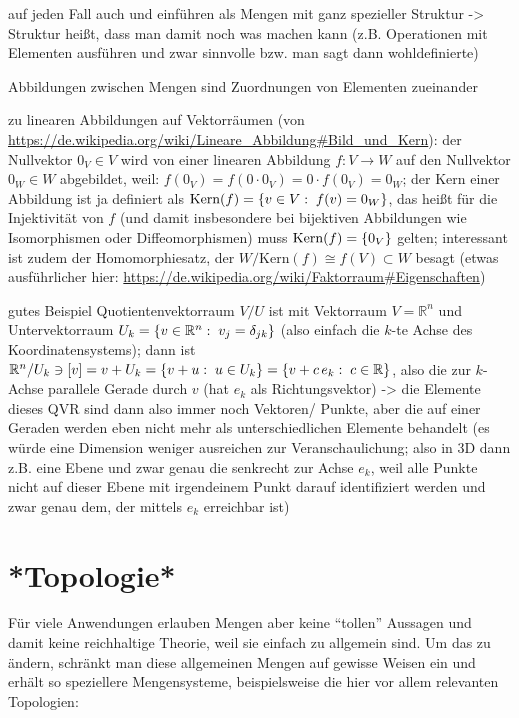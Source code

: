 \documentclass[../H_Analysis_main.tex]{subfiles}
\begin{document}
auf jeden Fall auch  und  einführen als Mengen mit ganz spezieller Struktur -> Struktur heißt, dass man damit noch was machen kann (z.B. Operationen mit Elementen ausführen und zwar sinnvolle bzw. man sagt dann wohldefinierte)


Abbildungen zwischen Mengen sind Zuordnungen von Elementen zueinander

zu linearen Abbildungen auf Vektorräumen (von \url{https://de.wikipedia.org/wiki/Lineare_Abbildung#Bild_und_Kern}): der Nullvektor $0_V \in V$ wird von einer linearen Abbildung $f: V \rightarrow W$ auf den Nullvektor $0_W \in W$ abgebildet, weil: $f(0_V) = f(0 \cdot 0_V) = 0 \cdot f(0_V) = 0_W$; der Kern einer Abbildung ist ja definiert als $\text{Kern}(f) = \qty{v \in V: \; f(v) = 0_W}$, das heißt für die Injektivität von $f$ (und damit insbesondere bei bijektiven Abbildungen wie Isomorphismen oder Diffeomorphismen) muss $\text{Kern}(f) = \qty{0_V}$ gelten; interessant ist zudem der Homomorphiesatz, der $W/ \text{Kern}(f) \cong f(V) \subset W$ besagt (etwas ausführlicher hier: \url{https://de.wikipedia.org/wiki/Faktorraum#Eigenschaften})

gutes Beispiel Quotientenvektorraum $V/ U$ ist mit Vektorraum $V = \mathbb{R}^n$ und Untervektorraum $U_k = \qty{v \in \mathbb{R}^n: \; v_j = \delta_{j k}}$ (also einfach die $k$-te Achse des Koordinatensystems); dann ist $\mathbb{R}^n/ U_k \ni [v] = v + U_k = \qty{v + u: \; u \in U_k} = \qty{v + c \, e_k: \; c \in \mathbb{R}}$, also die zur $k$-Achse parallele Gerade durch $v$ (hat $e_k$ als Richtungsvektor) -> die Elemente dieses QVR sind dann also immer noch Vektoren/ Punkte, aber die auf einer Geraden werden eben nicht mehr als unterschiedlichen Elemente behandelt (es würde eine Dimension weniger ausreichen zur Veranschaulichung; also in 3D dann z.B. eine Ebene und zwar genau die senkrecht zur Achse $e_k$, weil alle Punkte nicht auf dieser Ebene mit irgendeinem Punkt darauf identifiziert werden und zwar genau dem, der mittels $e_k$ erreichbar ist)


\newpage


	\section{*Topologie*}
Für viele Anwendungen erlauben Mengen aber keine \enquote{tollen} Aussagen und damit keine reichhaltige Theorie, weil sie einfach zu allgemein sind. Um das zu ändern, schränkt man diese allgemeinen Mengen auf gewisse Weisen ein und erhält so speziellere Mengensysteme, beispielsweise die hier vor allem relevanten Topologien:
\end{document}
